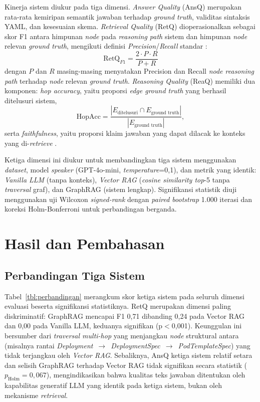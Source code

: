 \documentclass{ieeeaccess}
\begin{document}
Kinerja sistem diukur pada tiga dimensi. \textit{Answer Quality} (AnsQ) merupakan rata-rata kemiripan semantik jawaban terhadap \textit{ground truth}, validitas sintaksis YAML, dan kesesuaian skema. \textit{Retrieval Quality} (RetQ) dioperasionalkan sebagai skor F1 antara himpunan \textit{node} pada \textit{reasoning path} sistem dan himpunan \textit{node} relevan \textit{ground truth}, mengikuti definisi \textit{Precision}/\textit{Recall} standar \cite{manning_ir_2008}:
\begin{equation}
\text{RetQ}_{F1} = \frac{2 \cdot P \cdot R}{P + R}
\label{eq:f1}
\end{equation}
dengan $P$ dan $R$ masing-masing menyatakan Precision dan Recall \textit{node reasoning path} terhadap \textit{node} relevan \textit{ground truth}. \textit{Reasoning Quality} (ReaQ) memiliki dua komponen: \textit{hop accuracy}, yaitu proporsi \textit{edge ground truth} yang berhasil ditelusuri sistem,
\begin{equation}
\text{HopAcc} = \frac{|E_{\text{ditelusuri}} \cap E_{\text{ground truth}}|}{|E_{\text{ground truth}}|},
\label{eq:hopacc}
\end{equation}
serta \textit{faithfulness}, yaitu proporsi klaim jawaban yang dapat dilacak ke konteks yang di-\textit{retrieve} \cite{es_ragas_2023}.

Ketiga dimensi ini diukur untuk membandingkan tiga sistem menggunakan \textit{dataset}, model \textit{speaker} (GPT-4o-mini, \textit{temperature}=0,1), dan metrik yang identik: \textit{Vanilla LLM} (tanpa konteks), \textit{Vector RAG} (\textit{cosine similarity top}-5 tanpa \textit{traversal} graf), dan GraphRAG (sistem lengkap). Signifikansi statistik diuji menggunakan uji Wilcoxon \textit{signed-rank} dengan \textit{paired bootstrap} 1.000 iterasi dan koreksi Holm-Bonferroni untuk perbandingan berganda.

\section{Hasil dan Pembahasan}
\label{sec:hasil}

\subsection{Perbandingan Tiga Sistem}

Tabel~\ref{tbl:perbandingan} merangkum skor ketiga sistem pada seluruh dimensi evaluasi beserta signifikansi statistiknya. RetQ merupakan dimensi paling diskriminatif: GraphRAG mencapai F1 0,71 dibanding 0,24 pada Vector RAG dan 0,00 pada Vanilla LLM, keduanya signifikan (p$<$0,001). Keunggulan ini bersumber dari \textit{traversal multi-hop} yang menjangkau \textit{node} struktural antara (misalnya rantai \textit{Deployment}~$\to$~\textit{DeploymentSpec}~$\to$~\textit{PodTemplateSpec}) yang tidak terjangkau oleh \textit{Vector RAG}. Sebaliknya, AnsQ ketiga sistem relatif setara dan selisih GraphRAG terhadap Vector RAG tidak signifikan secara statistik ($p_{\text{Holm}}=0{,}067$), mengindikasikan bahwa kualitas teks jawaban ditentukan oleh kapabilitas generatif LLM yang identik pada ketiga sistem, bukan oleh mekanisme \textit{retrieval}.
\end{document}
